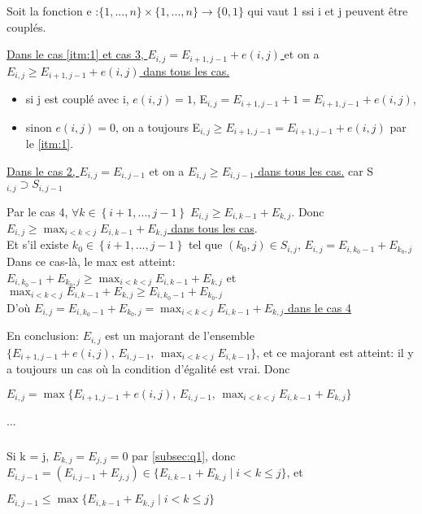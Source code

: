 \documentclass[french]{article}
\begin{document}
		Soit la fonction e :$ \{1, ... , n\} \times{} \{1, ... , n\} \rightarrow{} \{0, 1\}$ qui vaut 1 ssi i et j peuvent être couplés. \par
		\begin{description}
		\item
		\underline{Dans le cas  \ref{itm:1} et cas 3, $E_{i,j} = E_{i+1,j-1} + e(i,j)$ }  
et on a  \underline{$E_{i,j} \geq E_{i+1,j-1} + e(i,j)$ dans tous les cas. } 
			\begin{itemize} 
			\item si j est couplé avec i, $ e(i,j) = 1$, E$_{i,j}  = E_{i+1,j-1}+1 = E_{i+1,j-1}+ e(i,j) $, 
			\item sinon $ e(i,j) = 0$, on a toujours E$_{i,j} \geq E_{i+1,j-1} = E_{i+1,j-1}+ e(i,j)$ par le \ref{itm:1}.
			\end{itemize}	
		\item
		\underline{Dans le cas 2, $E_{i,j} = E_{i,j-1}$} et on a \underline{$E_{i,j} \geq E_{i,j-1}$ dans tous les cas.} car S$_{i,j} \supset S_{i,j-1}$
		\item
		Par le cas 4, $\forall k \in\left\{ i+1,...,j-1\right\} \; E_{i,j} \geq E_{i,k-1} + E_{k,j}$. Donc \underline{ $E_{i,j} \geq  \displaystyle \max_{i<k<j}  E_{i,k-1} + E_{k,j}$ dans tous les cas}.
		\\Et
		s'il existe $k_{0}\in\left\{ i+1,...,j-1\right\}$ tel que  $\left(k_{0},j\right)\in S_{i,j}$, $E_{i,j} = E_{i,k_{0}-1} + E_{k_{0},j}$\\
		Dans ce cas-là, le max est atteint:\\
		 $E_{i,k_{0}-1} + E_{k_{0},j} \geq  \displaystyle \max_{i<k<j}  E_{i,k-1} + E_{k,j}$ et $ \displaystyle \max_{i<k<j}  E_{i,k-1} + E_{k,j} \geq  E_{i,k_{0}-1} + E_{k_{0},j}$\\
		D'où \underline{ $E_{i,j} = E_{i,k_{0}-1} + E_{k_{0},j} = \displaystyle \max_{i<k<j}  E_{i,k-1} + E_{k,j}$ dans le cas 4}
		\end{description}
		En conclusion: $E_{i,j}$ est un majorant de l'ensemble $\{E_{i+1,j-1} + e(i,j), \, E_{i,j-1}, \,  \displaystyle \max_{i<k<j}  E_{i,k-1} \}$, et ce majorant est atteint: il y a toujours un cas où la condition d'égalité est vrai. 
		Donc
\begin{center}
 $E_{i,j} =\max\{E_{i+1,j-1} + e(i,j), \, E_{i,j-1}, \,  \displaystyle \max_{i<k<j}  E_{i,k-1} + E_{k,j}\}$
\par\end{center}
		...
	\subsubsection{}
	Si k = j, $ E_{k,j}=E_{j,j}=0$ par \ref{subsec:q1}, donc $E_{i,j-1}=(E_{i,j-1}+E_{j,j})\in \{E_{i,k-1} + E_{k,j} \mid i<k\leq j   \} $, et 
\begin{center}
$E_{i,j-1}\leq \max \{E_{i,k-1} + E_{k,j} \mid i<k\leq j   \} $
\par\end{center}
\end{document}
